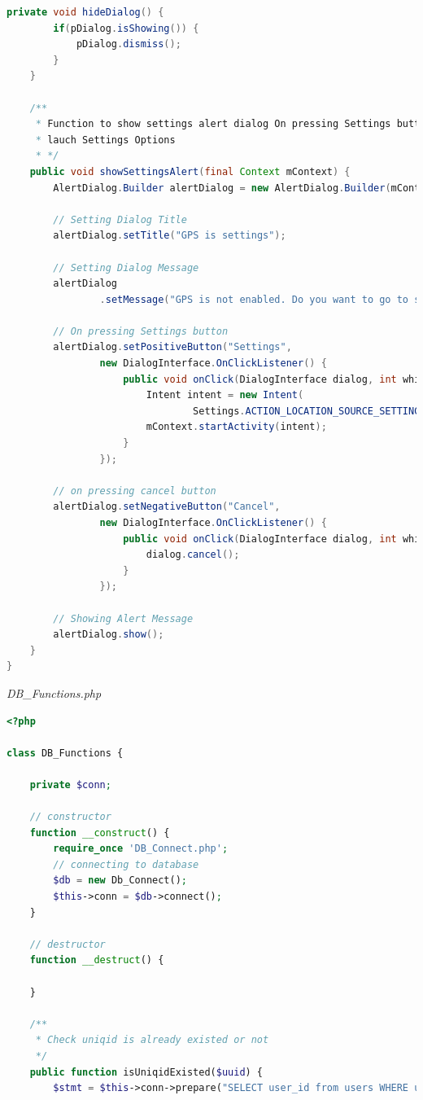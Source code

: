 \documentclass{article}
\begin{document}
\begin{landscape}
\begin{lstlisting}[language=Java,basicstyle=\tiny]
    private void hideDialog() {
        if(pDialog.isShowing()) {
            pDialog.dismiss();
        }
    }

    /**
     * Function to show settings alert dialog On pressing Settings button will
     * lauch Settings Options
     * */
    public void showSettingsAlert(final Context mContext) {
        AlertDialog.Builder alertDialog = new AlertDialog.Builder(mContext);

        // Setting Dialog Title
        alertDialog.setTitle("GPS is settings");

        // Setting Dialog Message
        alertDialog
                .setMessage("GPS is not enabled. Do you want to go to settings menu?");

        // On pressing Settings button
        alertDialog.setPositiveButton("Settings",
                new DialogInterface.OnClickListener() {
                    public void onClick(DialogInterface dialog, int which) {
                        Intent intent = new Intent(
                                Settings.ACTION_LOCATION_SOURCE_SETTINGS);
                        mContext.startActivity(intent);
                    }
                });

        // on pressing cancel button
        alertDialog.setNegativeButton("Cancel",
                new DialogInterface.OnClickListener() {
                    public void onClick(DialogInterface dialog, int which) {
                        dialog.cancel();
                    }
                });

        // Showing Alert Message
        alertDialog.show();
    }
}
\end{lstlisting}
{\large \textit{DB\_Functions.php}}
\begin{lstlisting}[language=php,basicstyle=\tiny,showstringspaces=false]
<?php
 
class DB_Functions {
 
    private $conn;
 
    // constructor
    function __construct() {
        require_once 'DB_Connect.php';
        // connecting to database
        $db = new Db_Connect();
        $this->conn = $db->connect();
    }
 
    // destructor
    function __destruct() {
         
    }
	
	/**
	 * Check uniqid is already existed or not
	 */
	public function isUniqidExisted($uuid) {
		$stmt = $this->conn->prepare("SELECT user_id from users WHERE user_id = ?");
		

\end{lstlisting}
\end{landscape}
\end{document}
